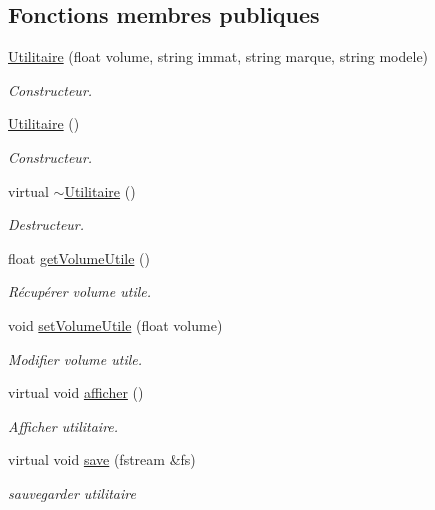 \subsection*{Fonctions membres publiques}
\begin{DoxyCompactItemize}
\item 
\hyperlink{class_utilitaire_a8fdab85b9894115b001e296eea151dec}{Utilitaire} (float volume, string immat, string marque, string modele)
\begin{DoxyCompactList}\small\item\em Constructeur. \item\end{DoxyCompactList}\item 
\hyperlink{class_utilitaire_a8a4af48b60aaeefe9b6399ed94495662}{Utilitaire} ()
\begin{DoxyCompactList}\small\item\em Constructeur. \item\end{DoxyCompactList}\item 
virtual \hyperlink{class_utilitaire_af6e70ea8eb994ab8744429b37d5a9934}{$\sim$Utilitaire} ()
\begin{DoxyCompactList}\small\item\em Destructeur. \item\end{DoxyCompactList}\item 
float \hyperlink{class_utilitaire_acde47d7bc100eb5fdf2195bb8307d36a}{getVolumeUtile} ()
\begin{DoxyCompactList}\small\item\em Récupérer volume utile. \item\end{DoxyCompactList}\item 
void \hyperlink{class_utilitaire_a085a6c510c036cbb88d91682751f3588}{setVolumeUtile} (float volume)
\begin{DoxyCompactList}\small\item\em Modifier volume utile. \item\end{DoxyCompactList}\item 
virtual void \hyperlink{class_utilitaire_a1092986e687a5a907bc86d252a8416c9}{afficher} ()
\begin{DoxyCompactList}\small\item\em Afficher utilitaire. \item\end{DoxyCompactList}\item 
virtual void \hyperlink{class_utilitaire_a7ee59be5d77191b06b2c959bdf2297b7}{save} (fstream \&fs)
\begin{DoxyCompactList}\small\item\em sauvegarder utilitaire \item\end{DoxyCompactList}\end{DoxyCompactItemize}


